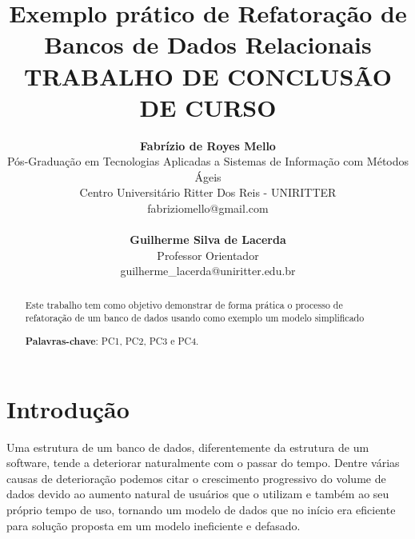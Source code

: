\documentclass[10pt]{article}
\begin{document}
\title{Exemplo prático de Refatoração de Bancos de Dados Relacionais\\ \smallskip
\small{TRABALHO DE CONCLUSÃO DE CURSO}}

\author{
	{\bf Fabrízio de Royes Mello }\\ 
	{\normalsize Pós-Graduação em Tecnologias Aplicadas a Sistemas de Informação com Métodos Ágeis} \\
	{\normalsize Centro Universitário Ritter Dos Reis - UNIRITTER} \\
	{\normalsize fabriziomello@gmail.com}  \\ \\
	{\bf Guilherme Silva de Lacerda } \\
	{\normalsize Professor Orientador}\\
	{\normalsize guilherme\_lacerda@uniritter.edu.br} \\
}
\maketitle


\begin{abstract}
\maketitle
\noindent
\small
Este trabalho tem como objetivo demonstrar de forma prática o processo de refatoração de um banco de dados usando como exemplo um modelo simplificado

\noindent
\textbf{Palavras-chave}: PC1, PC2, PC3 e PC4.
\end{abstract}

\maketitle
\section{Introdução} \label{sec:intro}

	Uma estrutura de um banco de dados, diferentemente da estrutura de um software, tende a deteriorar naturalmente com o passar do tempo. Dentre várias causas de deterioração podemos citar o crescimento progressivo do volume de dados devido ao aumento natural de usuários que o utilizam e também ao seu próprio tempo de uso, tornando um modelo de dados que no início era eficiente para solução proposta em um modelo ineficiente e defasado.
\end{document}
